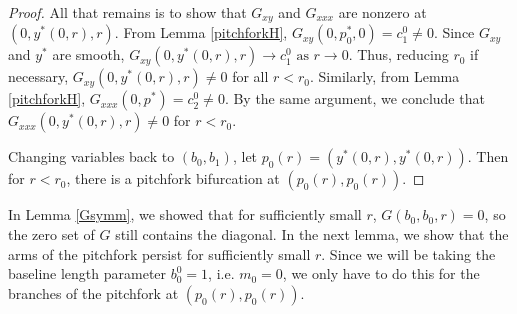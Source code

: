 \documentclass[thesis.tex]{subfiles}
\begin{document}
\begin{lemma}
\begin{proof}
All that remains is to show that $G_{xy}$ and $G_{xxx}$ are nonzero at $(0, y^*(0, r), r)$. From Lemma \ref{pitchforkH}, $G_{xy}(0, p_0^*, 0) = c_1^0 \neq 0$. Since $G_{xy}$ and $y^*$ are smooth, $G_{xy}(0, y^*(0, r), r) \rightarrow c_1^0 \text{ as } r \rightarrow 0$. Thus, reducing $r_0$ if necessary, $G_{xy}(0, y^*(0, r), r) \neq 0$ for all $r < r_0$. Similarly, from Lemma \ref{pitchforkH}, $G_{xxx}(0, p^*) = c_2^0 \neq 0$. By the same argument, we conclude that $G_{xxx}(0, y^*(0, r), r) \neq 0$ for $r < r_0$.

Changing variables back to $(b_0, b_1)$, let $p_0(r) = (y^*(0, r), y^*(0, r))$. Then for $r < r_0$, there is a pitchfork bifurcation at $(p_0(r), p_0(r))$.
\end{proof}
\end{lemma}

In Lemma \ref{Gsymm}, we showed that for sufficiently small $r$, $G(b_0, b_0, r) = 0$, so the zero set of $G$ still contains the diagonal. In the next lemma, we show that the arms of the pitchfork persist for sufficiently small $r$. Since we will be taking the baseline length parameter $b_0^0 = 1$, i.e. $m_0 = 0$, we only have to do this for the branches of the pitchfork at $(p_0(r), p_0(r))$.
\end{document}
